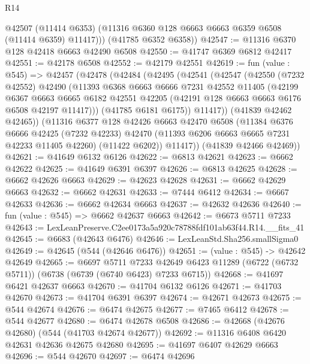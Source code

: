 \begin{lexlean}{R14}
\begin{coremodule}
          @42507
          (@11414 @6353)
          (@11316 @6360 @128 @6663 @6663 @6359 @6508 (@11414 @6359) @11417)))
      (@41785 @6352 @6358))
@42547 := @11316 @6370 @128 @42418 @6663 @42490 @6508
@42550 := @41747 @6369 @6812 @42417
@42551 := @42178 @6508
@42552 := @42179 @42551
@42619 := fun (value : @545) =>
  @42457
    (@42478
      (@42484
        (@42495
          (@42541
            (@42547
              (@42550
                (@7232 @42552)
                @42490
                (@11393
                  @6368
                  @6663
                  @6666
                  @7231
                  @42552
                  @11405
                  (@42199
                    @6367
                    @6663
                    @6665
                    @6182
                    @42551
                    @42205
                    (@42191 @128 @6663 @6663 @6176 @6508 @42197 @11417)))
                (@41785 @6181 @6175))
              @11417))
          (@41839 @42462 @42465))
        (@11316
          @6377
          @128
          @42426
          @6663
          @42470
          @6508
          (@11384
            @6376
            @6666
            @42425
            (@7232 @42233)
            @42470
            (@11393 @6206 @6663 @6665 @7231 @42233 @11405 @42260)
            (@11422 @6202))
          @11417))
      (@41839 @42466 @42469))
@42621 := @41649 @6132 @6126
@42622 := @6813 @42621
@42623 := @6662 @42622
@42625 := @41649 @6391 @6397
@42626 := @6813 @42625
@42628 := @6662 @42626 @6663
@42629 := @42623 @42628
@42631 := @6662 @42629 @6663
@42632 := @6662 @42631
@42633 := @7444 @6412
@42634 := @6667 @42633
@42636 := @6662 @42634 @6663
@42637 := @42632 @42636
@42640 := fun (value : @545) => @6662 @42637 @6663
@42642 := @6673 @5711 @7233
@42643 := LexLeanPreserve.C2ee0173a5a920c78788fdf101ab63f44.R14.__fits_41
@42645 := @6683 (@42643 @6476)
@42646 := LexLeanStd.Sha256.smallSigma0
@42649 := @42645 (@544 (@42646 @6476))
@42651 := (value : @545) -> @42642 @42649
@42665 := @6697
    @5711
    @7233
    @42649
    @6423
    @11289
    (@6722 (@6732 @5711))
    (@6738 (@6739 (@6740 @6423) @7233 @6715))
@42668 := @41697 @6421 @42637 @6663
@42670 := @41704 @6132 @6126
@42671 := @41703 @42670
@42673 := @41704 @6391 @6397
@42674 := @42671 @42673
@42675 := @544 @42674
@42676 := @6474 @42675
@42677 := @7465 @6412
@42678 := @544 @42677
@42680 := @6474 @42678 @6508
@42686 := @42668 (@42676 @42680) (@544 (@41703 @42674 @42677))
@42692 := @11316 @6408 @6420 @42631 @42636 @42675 @42680
@42695 := @41697 @6407 @42629 @6663
@42696 := @544 @42670
@42697 := @6474 @42696

\end{coremodule}
\end{lexlean}
